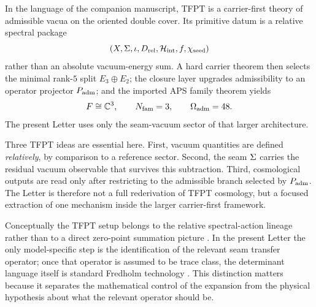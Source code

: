 In the language of the companion manuscript, TFPT is a carrier-first theory of admissible vacua on the oriented double cover. Its primitive datum is a relative spectral package
\[
(X,\Sigma,\iota,D_{\mathrm{rel}},\mathcal H_{\mathrm{int}},f,\chi_{\mathrm{seed}})
\]
rather than an absolute vacuum-energy sum. A hard carrier theorem then selects the minimal rank-$5$ split $E_3\oplus E_2$; the closure layer upgrades admissibility to an operator projector $P_{\mathrm{adm}}$; and the imported APS family theorem yields
\[
F\cong\mathbb C^3,
\qquad
N_{\mathrm{fam}}=3,
\qquad
\Omega_{\mathrm{adm}}=48.
\]
The present Letter uses only the seam-vacuum sector of that larger architecture.

Three TFPT ideas are essential here. First, vacuum quantities are defined \emph{relatively}, by comparison to a reference sector. Second, the seam $\Sigma$ carries the residual vacuum observable that survives this subtraction. Third, cosmological outputs are read only after restricting to the admissible branch selected by $P_{\mathrm{adm}}$. The Letter is therefore not a full rederivation of TFPT cosmology, but a focused extraction of one mechanism inside the larger carrier-first framework.

Conceptually the TFPT setup belongs to the relative spectral-action lineage rather than to a direct zero-point summation picture \cite{connes1997}. In the present Letter the only model-specific step is the identification of the relevant seam transfer operator; once that operator is assumed to be trace class, the determinant language itself is standard Fredholm technology \cite{simon2005}. This distinction matters because it separates the mathematical control of the expansion from the physical hypothesis about what the relevant operator should be.

\begin{center}
\end{center}

